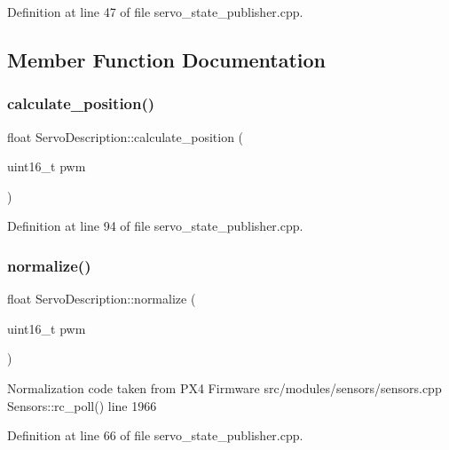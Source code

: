 Definition at line 47 of file servo\+\_\+state\+\_\+publisher.\+cpp.



\subsection{Member Function Documentation}
\mbox{\label{classServoDescription_aac283ff9565c80e5dd5434a03b2d5ab0}} 
\subsubsection{\texorpdfstring{calculate\_position()}{calculate\_position()}}
{\footnotesize\ttfamily float Servo\+Description\+::calculate\+\_\+position (\begin{DoxyParamCaption}\item[{uint16\+\_\+t}]{pwm }\end{DoxyParamCaption})\hspace{0.3cm}{\ttfamily [inline]}}



Definition at line 94 of file servo\+\_\+state\+\_\+publisher.\+cpp.

\mbox{\label{classServoDescription_a9b53028329d9f4730d0e954ba682bc6b}} 
\subsubsection{\texorpdfstring{normalize()}{normalize()}}
{\footnotesize\ttfamily float Servo\+Description\+::normalize (\begin{DoxyParamCaption}\item[{uint16\+\_\+t}]{pwm }\end{DoxyParamCaption})\hspace{0.3cm}{\ttfamily [inline]}}

Normalization code taken from P\+X4 Firmware src/modules/sensors/sensors.\+cpp Sensors\+::rc\+\_\+poll() line 1966 

Definition at line 66 of file servo\+\_\+state\+\_\+publisher.\+cpp.



